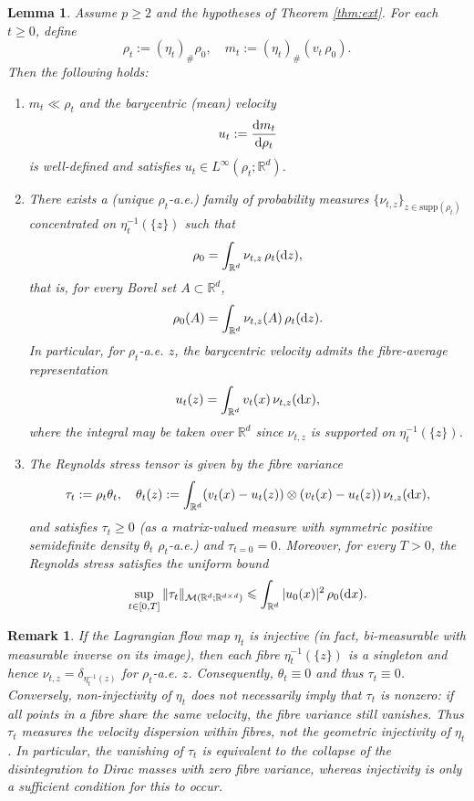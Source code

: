 \documentclass[10pt,reqno]{amsart}
\renewcommand{\geq}{\geqslant}
\renewcommand{\ge}{\geqslant}
\renewcommand{\le}{\leqslant}
\numberwithin{equation}{section}
\newtheorem{lemma}{Lemma}[section]
\newtheorem{remark}{Remark}[section]
\newcommand{\R}{\mathbb R}
\newcommand{\intr}{\int_{\R^d}}
\newcommand{\calM}{\mathcal M}
\newcommand{\rd}{\textnormal{d}}
\newcommand{\dx}{\textnormal{d}x}
\newcommand{\dz}{\textnormal{d}z}
\newcommand{\supp}{\text{supp}}
\begin{document}
\begin{lemma} \label{lem:ERA-prep}
Assume $p\geq 2$ and the hypotheses of Theorem \ref{thm:ext}. For each $t\ge0$, define
\[
\rho_t := (\eta_t)_\# \rho_0, \quad m_t := (\eta_t)_\#(v_t\,\rho_0).
\]
Then the following holds:
\begin{enumerate}[label=(\roman*)]
\item $m_t \ll \rho_t$ and the barycentric (mean) velocity
\[
u_t := \frac{\rd m_t}{\rd\rho_t}
\]
is well-defined and satisfies $u_t\in L^\infty(\rho_t;\R^d)$.

\item There exists a (unique $\rho_t$-a.e.) family of probability measures 
$\{\nu_{t,z}\}_{z\in \supp(\rho_t)}$ concentrated on $\eta_t^{-1}(\{z\})$ such that
\[
\rho_0 = \intr \nu_{t,z}\,\rho_t(\dz),
\]
that is, for every Borel set $A\subset\R^d$,
\[
\rho_0(A)=\intr \nu_{t,z}(A)\,\rho_t(\dz).
\]
In particular, for $\rho_t$-a.e.  $z$, the barycentric velocity admits the fibre-average representation
\[
u_t(z)=\intr v_t(x)\,\nu_{t,z}(\dx),
\]
where the integral may be taken over $\R^d$ since $\nu_{t,z}$ is supported on $\eta_t^{-1}(\{z\})$.

\item The Reynolds stress tensor is given by the fibre variance
\[
\tau_t := \rho_t \theta_t,  \quad \theta_t(z) := \intr (v_t(x)-u_t(z))\otimes(v_t(x)-u_t(z))\,\nu_{t,z}(\dx),
\]
and satisfies $\tau_t \ge 0$ (as a matrix-valued measure with symmetric positive semidefinite density $\theta_t$ $\rho_t$-a.e.) and $\tau_{t=0} = 0$. Moreover, for every $T>0$, the Reynolds stress satisfies the uniform bound
\[
\sup_{t\in[0,T]}\|\tau_t\|_{\calM(\R^d;\R^{d\times d})} \le \intr |u_0(x)|^2\,\rho_0(\dx).
\]
\end{enumerate}
\end{lemma}

 

\begin{remark}
If the Lagrangian flow map $\eta_t$ is injective (in fact, bi-measurable with measurable inverse on its image), then each fibre $\eta_t^{-1}(\{z\})$ is a singleton and hence $\nu_{t,z}=\delta_{\eta_t^{-1}(z)}$ for $\rho_t$-a.e.  $z$. Consequently, $\theta_t \equiv 0$ and thus $\tau_t \equiv 0$. Conversely, non-injectivity of $\eta_t$ does not necessarily imply that $\tau_t$ is nonzero: if all points in a fibre share the same velocity, the fibre variance still vanishes. Thus $\tau_t$ measures the velocity dispersion within fibres, not the geometric injectivity of $\eta_t$. In particular, the vanishing of $\tau_t$ is equivalent to the collapse of the disintegration to Dirac masses with zero fibre variance, whereas injectivity is only a sufficient condition for this to occur.
\end{remark}
\end{document}
